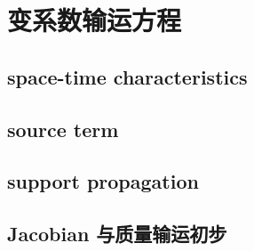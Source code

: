 \section{变系数输运方程}
\label{b2:sec:0703}


\subsection{space-time characteristics}
\label{b2:subsec:070301}

\subsection{source term}
\label{b2:subsec:070302}

\subsection{support propagation}
\label{b2:subsec:070303}

\subsection{Jacobian 与质量输运初步}
\label{b2:subsec:070304}



